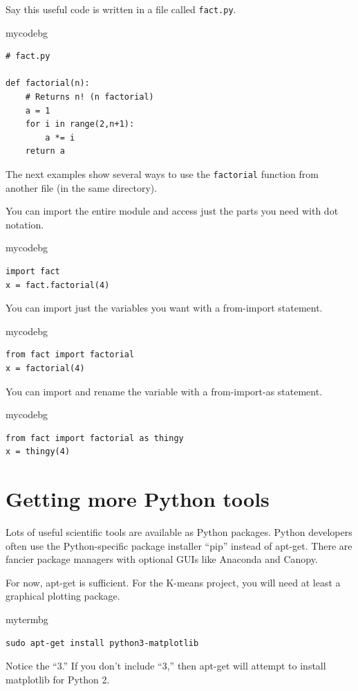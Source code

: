 Say this useful code is written in a file called \texttt{fact.py}.
\begin{tsession}{mycodebg}
\begin{verbatim}
# fact.py

def factorial(n):
    # Returns n! (n factorial)
    a = 1
    for i in range(2,n+1):
        a *= i
    return a
\end{verbatim}
\end{tsession}
The next examples show several ways to use the \texttt{factorial} function from another file (in the same directory).

You can import the entire module and access just the parts you need with dot notation.
\begin{tsession}{mycodebg}
\begin{verbatim}
import fact
x = fact.factorial(4)
\end{verbatim}
\end{tsession}
You can import just the variables you want with a from-import statement.
\begin{tsession}{mycodebg}
\begin{verbatim}
from fact import factorial
x = factorial(4)
\end{verbatim}
\end{tsession}
You can import and rename the variable with a from-import-as statement.
\begin{tsession}{mycodebg}
\begin{verbatim}
from fact import factorial as thingy
x = thingy(4)
\end{verbatim}
\end{tsession}

\section{Getting more Python tools}
Lots of useful scientific tools are available as Python packages.
Python developers often use the Python-specific package installer ``pip'' instead of apt-get.
There are fancier package managers with optional GUIs like Anaconda and Canopy.

For now, apt-get is sufficient.
For the K-means project, you will need at least a graphical plotting package.
\begin{tsession}{mytermbg}
\begin{verbatim}
sudo apt-get install python3-matplotlib
\end{verbatim}
\end{tsession}
Notice the ``3.''
If you don't include ``3,'' then apt-get will attempt to install matplotlib for Python 2.

